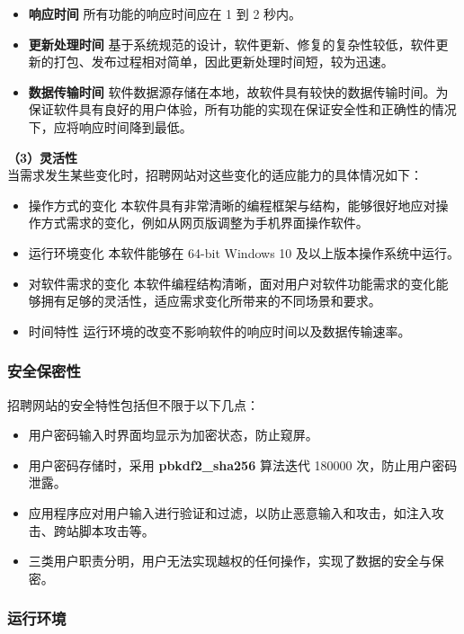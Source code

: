 \documentclass[UTF8,a4paper,10pt]{ctexart}
\begin{document}
\begin{itemize}
    \item \textbf{响应时间} \space 所有功能的响应时间应在 1 到 2 秒内。
    \item \textbf{更新处理时间} \space 基于系统规范的设计，软件更新、修复的复杂性较低，软件更新的打包、发布过程相对简单，因此更新处理时间短，较为迅速。
    \item \textbf{数据传输时间} \space 软件数据源存储在本地，故软件具有较快的数据传输时间。为保证软件具有良好的用户体验，所有功能的实现在保证安全性和正确性的情况下，应将响应时间降到最低。
\end{itemize}

\textbf{（3）灵活性}\\
当需求发生某些变化时，招聘网站对这些变化的适应能力的具体情况如下：

\begin{itemize}
    \item 操作方式的变化 本软件具有非常清晰的编程框架与结构，能够很好地应对操作方式需求的变化，例如从网页版调整为手机界面操作软件。
    \item 运行环境变化 本软件能够在 64-bit Windows 10 及以上版本操作系统中运行。
    \item 对软件需求的变化 本软件编程结构清晰，面对用户对软件功能需求的变化能够拥有足够的灵活性，适应需求变化所带来的不同场景和要求。
    \item 时间特性 运行环境的改变不影响软件的响应时间以及数据传输速率。
\end{itemize}

\subsubsection{安全保密性}

招聘网站的安全特性包括但不限于以下几点：
\begin{itemize}
    \item 用户密码输入时界面均显示为加密状态，防止窥屏。
    \item 用户密码存储时，采用 \textbf{pbkdf2\_sha256} 算法迭代 180000 次，防止用户密码泄露。
    \item 应用程序应对用户输入进行验证和过滤，以防止恶意输入和攻击，如注入攻击、跨站脚本攻击等。
    \item 三类用户职责分明，用户无法实现越权的任何操作，实现了数据的安全与保密。
\end{itemize}

\subsubsection{运行环境}
\end{document}
